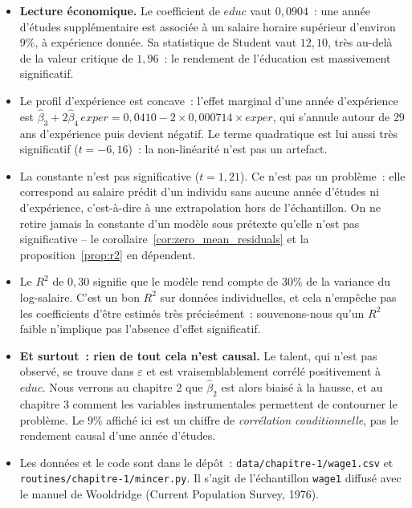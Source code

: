 \documentclass[10pt,a4paper]{article}
\theoremstyle{definition}
\renewcommand{\newline}{\unskip\par\vspace{1.5pt}}
\begin{document}
\begin{notes}

  \begin{itemize}

  \item \textbf{Lecture économique.} Le coefficient de $educ$ vaut $0{,}0904$~: une
    année d'études supplémentaire est associée à un salaire horaire supérieur
    d'environ $9\%$, à expérience donnée. Sa statistique de Student vaut $12{,}10$,
    très au-delà de la valeur critique de $1{,}96$~: le rendement de l'éducation est
    massivement significatif.\newline

  \item Le profil d'expérience est concave~: l'effet marginal d'une année d'expérience
    est $\hat\beta_3 + 2\hat\beta_4\,exper = 0{,}0410 - 2\times 0{,}000714\times exper$,
    qui s'annule autour de $29$ ans d'expérience puis devient négatif. Le terme
    quadratique est lui aussi très significatif ($t=-6{,}16$)~: la non-linéarité n'est
    pas un artefact.\newline

  \item La constante n'est pas significative ($t=1{,}21$). Ce n'est pas un problème~:
    elle correspond au salaire prédit d'un individu sans aucune année d'études ni
    d'expérience, c'est-à-dire à une extrapolation hors de l'échantillon. On ne retire
    jamais la constante d'un modèle sous prétexte qu'elle n'est pas significative -- le
    corollaire~\ref{cor:zero_mean_residuals} et la proposition~\ref{prop:r2} en
    dépendent.\newline

  \item Le $R^2$ de $0{,}30$ signifie que le modèle rend compte de $30\%$ de la
    variance du log-salaire. C'est un bon $R^2$ sur données individuelles, et cela
    n'empêche pas les coefficients d'être estimés très précisément~: souvenons-nous
    qu'un $R^2$ faible n'implique pas l'absence d'effet significatif.\newline

  \item \textbf{Et surtout~: rien de tout cela n'est causal.} Le talent, qui n'est pas
    observé, se trouve dans $\varepsilon$ et est vraisemblablement corrélé
    positivement à $educ$. Nous verrons au chapitre 2 que $\hat\beta_2$ est alors biaisé
    à la hausse, et au chapitre 3 comment les variables instrumentales permettent de
    contourner le problème. Le $9\%$ affiché ici est un chiffre de \emph{corrélation
    conditionnelle}, pas le rendement causal d'une année d'études.\newline

  \item Les données et le code sont dans le dépôt~:
    \texttt{data/\allowbreak chapitre-1/\allowbreak wage1.csv} et
    \texttt{routines/\allowbreak chapitre-1/\allowbreak mincer.py}. Il s'agit de l'échantillon \texttt{wage1}
    diffusé avec le manuel de Wooldridge (Current Population Survey, 1976).

  \end{itemize}

\end{notes}
\end{document}
